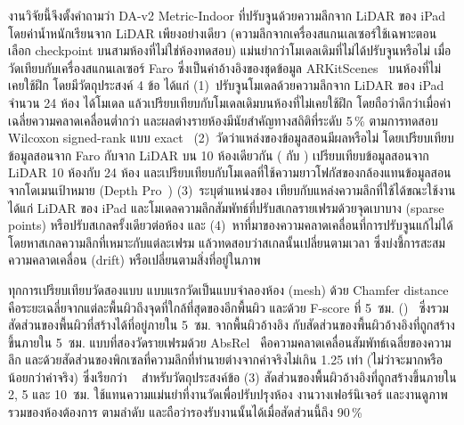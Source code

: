 งานวิจัยนี้จึงตั้งคำถามว่า \mbox{DA-v2} Metric-Indoor ที่ปรับจูนด้วยความลึกจาก LiDAR ของ iPad
โดยค่าน้ำหนักเรียนจาก LiDAR เพียงอย่างเดียว (ความลึกจากเครื่องสแกนเลเซอร์ใช้เฉพาะตอนเลือก checkpoint
บนสามห้องที่ไม่ใช่ห้องทดสอบ) แม่นยำกว่าโมเดลเดิมที่ไม่ได้ปรับจูนหรือไม่
เมื่อวัดเทียบกับเครื่องสแกนเลเซอร์ Faro ซึ่งเป็นค่าอ้างอิงของชุดข้อมูล ARKitScenes~\cite{arkitscenes}
บนห้องที่ไม่เคยใช้ฝึก โดยมีวัตถุประสงค์ 4 ข้อ ได้แก่
(1)~ปรับจูนโมเดลด้วยความลึกจาก LiDAR ของ iPad จำนวน 24 ห้อง ได้โมเดล \ftmain{}
แล้วเปรียบเทียบกับโมเดลเดิมบนห้องที่ไม่เคยใช้ฝึก โดยถือว่าดีกว่าเมื่อค่าเฉลี่ยความคลาดเคลื่อนต่ำกว่า
และผลต่างรายห้องมีนัยสำคัญทางสถิติที่ระดับ 5\,\% ตามการทดสอบ Wilcoxon signed-rank แบบ exact~\cite{wilcoxon}
(2)~วัดว่าแหล่งของข้อมูลสอนมีผลหรือไม่ โดยเปรียบเทียบข้อมูลสอนจาก Faro กับจาก LiDAR
บน 10 ห้องเดียวกัน (\ftfaro{} กับ \ftlidar{}) เปรียบเทียบข้อมูลสอนจาก LiDAR 10 ห้องกับ 24 ห้อง
และเปรียบเทียบกับโมเดลที่ใช้ความยาวโฟกัสของกล้องแทนข้อมูลสอนจากโดเมนเป้าหมาย (Depth Pro~\cite{depthpro})
(3)~ระบุตำแหน่งของ \ftmain{} เทียบกับแหล่งความลึกที่ใช้ได้ขณะใช้งาน ได้แก่ LiDAR ของ iPad
และโมเดลความลึกสัมพัทธ์ที่ปรับสเกลรายเฟรมด้วยจุดเบาบาง (sparse points) หรือปรับสเกลครั้งเดียวต่อห้อง
และ (4)~หาที่มาของความคลาดเคลื่อนที่การปรับจูนแก้ไม่ได้ โดยหาสเกลความลึกที่เหมาะกับแต่ละเฟรม
แล้วทดสอบว่าสเกลนั้นเปลี่ยนตามเวลา ซึ่งบ่งชี้การสะสมความคลาดเคลื่อน (drift) หรือเปลี่ยนตามสิ่งที่อยู่ในภาพ

ทุกการเปรียบเทียบวัดสองแบบ แบบแรกวัดเป็นแบบจำลองห้อง (mesh) ด้วย Chamfer distance~\cite{chamfer}
คือระยะเฉลี่ยจากแต่ละพื้นผิวถึงจุดที่ใกล้ที่สุดของอีกพื้นผิว และด้วย F-score ที่ 5~ซม.
(\fscore{})~\cite{tanks} ซึ่งรวมสัดส่วนของพื้นผิวที่สร้างได้ที่อยู่ภายใน 5~ซม. จากพื้นผิวอ้างอิง
กับสัดส่วนของพื้นผิวอ้างอิงที่ถูกสร้างขึ้นภายใน 5~ซม. แบบที่สองวัดรายเฟรมด้วย AbsRel~\cite{eigen14}
คือความคลาดเคลื่อนสัมพัทธ์เฉลี่ยของความลึก และด้วยสัดส่วนของพิกเซลที่ความลึกที่ทำนายต่างจากค่าจริงไม่เกิน 1.25 เท่า
(ไม่ว่าจะมากหรือน้อยกว่าค่าจริง) ซึ่งเรียกว่า \wone{}~\cite{eigen14}
สำหรับวัตถุประสงค์ข้อ (3) สัดส่วนของพื้นผิวอ้างอิงที่ถูกสร้างขึ้นภายใน 2, 5 และ 10~ซม.
ใช้แทนความแม่นยำที่งานวัดเพื่อปรับปรุงห้อง งานวางเฟอร์นิเจอร์ และงานดูภาพรวมของห้องต้องการ ตามลำดับ
และถือว่ารองรับงานนั้นได้เมื่อสัดส่วนนี้ถึง 90\,\%

